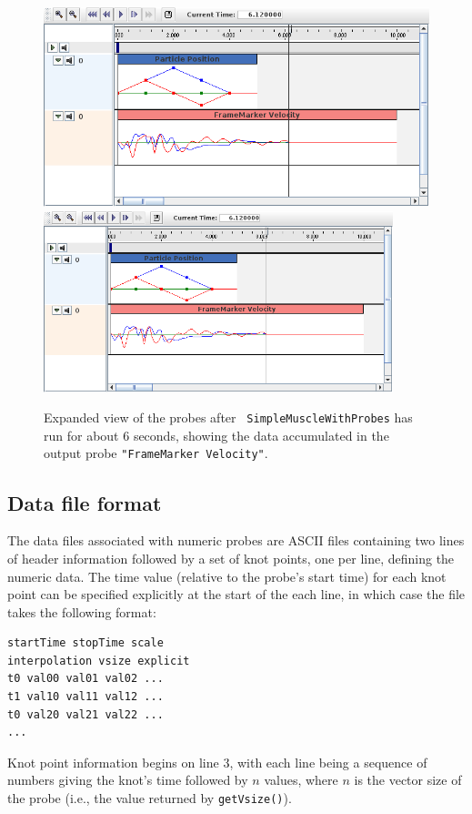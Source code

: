 \begin{figure}[ht]
\begin{center}
\iflatexml
 \includegraphics[]{images/timelineProbesExpanded}
\else
 \includegraphics[width=4in]{images/timelineProbesExpanded}
\fi
\end{center}
\caption{Expanded view of the probes after {\tt
SimpleMuscleWithProbes} has run for about 6 seconds, showing the data
accumulated in the output probe {\tt "FrameMarker Velocity"}.}
\label{probesExpanded:fig}
\end{figure}

\subsection{Data file format}
\label{DataFileFormat:sec}

The data files associated with numeric probes are ASCII files
containing two lines of header information followed by a set of knot
points, one per line, defining the numeric data. The time value
(relative to the probe's start time) for each knot point can be
specified explicitly at the start of the each line, in which case the
file takes the following format:
%
\begin{lstlisting}[]
startTime stopTime scale
interpolation vsize explicit
t0 val00 val01 val02 ...
t1 val10 val11 val12 ...
t0 val20 val21 val22 ...
...
\end{lstlisting}
%
Knot point information begins on line 3, with each line being a
sequence of numbers giving the knot's time followed by $n$ values,
where $n$ is the vector size of the probe (i.e., the value returned by
{\tt getVsize()}).

